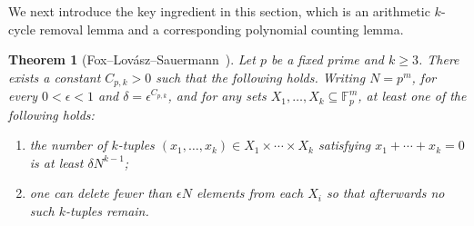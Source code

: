 \documentclass[A4paper,reqno,oneside,12pt]{amsart}
\theoremstyle{plain}
\newtheorem{theorem}{Theorem}[section]
\theoremstyle{definition}
\newtheorem{remark}[theorem]{Remark}
\newcommand{\e}{\mathbbm{1}}          %
\newcommand{\F}{\mathbb{F}}
\begin{document}



\bigskip
We next introduce the key ingredient in this section, which is an arithmetic $k$-cycle removal lemma and a corresponding polynomial counting lemma. 

\begin{theorem}[Fox--Lov\'asz--Sauermann~\cite{FLS}]\label{thm: FLS}
Let $p$ be a fixed prime and $k\ge 3$. There exists a constant $C_{p,k}>0$ such that the following holds.
Writing $N=p^m$, for every $0<\epsilon<1$ and $\delta=\epsilon^{C_{p,k}}$, and for any sets
$X_1,\dots,X_k\subseteq \F_p^m$, at least one of the following holds:
\begin{enumerate}[label=(\alph*)]
\item the number of $k$-tuples $(x_1,\dots,x_k)\in X_1\times\cdots\times X_k$ satisfying
$x_1+\cdots+x_k=0$ is at least $\delta N^{k-1}$;
\item one can delete fewer than $\epsilon N$ elements from each $X_i$ so that afterwards no such $k$-tuples remain.
\end{enumerate}
\end{theorem}
\end{document}

